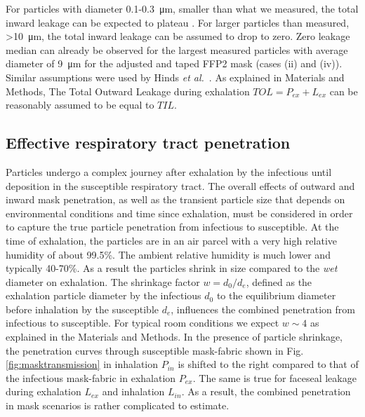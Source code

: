 \documentclass[preprint]{elsarticle}
\begin{document}
For particles with diameter 0.1-\SI{0.3}{\micro \meter}, smaller than what we measured, the total inward leakage can be expected to plateau \cite[cf.\ e.g.][]{lee2008respiratory, grinshpun2009performance}. For larger particles than measured, \textgreater \SI{10}{\micro \meter}, the total inward leakage can be assumed to drop to zero. Zero leakage median can already be observed for the largest measured particles with average diameter of \SI{9}{\micro \meter} for the adjusted and taped FFP2 mask (cases (ii) and (iv)).
Similar assumptions were used by Hinds \textit{et al.}\ \cite{hinds1987performance2}.
As explained in Materials and Methods, The Total Outward Leakage during exhalation $TOL=P_{ex}+L_{ex}$ can be reasonably assumed to be equal to $TIL$. 

\subsection{Effective respiratory tract penetration}
Particles undergo a complex journey after exhalation by the infectious until deposition in the susceptible respiratory tract.
The overall effects of outward and inward mask penetration, as well as the transient particle size that depends on environmental conditions and time since exhalation, must be considered in order to capture the true particle penetration from infectious to susceptible. 
At the time of exhalation, the particles are in an air parcel with a very high relative humidity of about 99.5\%. 
The ambient relative humidity is much lower and typically 40-70\%. 
As a result the particles shrink in size compared to the \emph{wet} diameter on exhalation. 
The shrinkage factor $w = d_0/d_e$, defined as the exhalation particle diameter by the infectious $d_0$ to the equilibrium diameter before inhalation by the susceptible $d_e$, influences the combined penetration from infectious to susceptible. 
For typical room conditions we expect $w\sim4$ as explained in the Materials and Methods. 
In the presence of particle shrinkage, the penetration curves through susceptible mask-fabric shown in Fig. \ref{fig:masktransmission} in inhalation $P_{in}$ is shifted to the right compared to that of the infectious mask-fabric in exhalation $P_{ex}$. 
The same is true for faceseal leakage during exhalation $L_{ex}$ and inhalation $L_{in}$.
As a result, the combined penetration in mask scenarios is rather complicated to estimate. 
\end{document}
